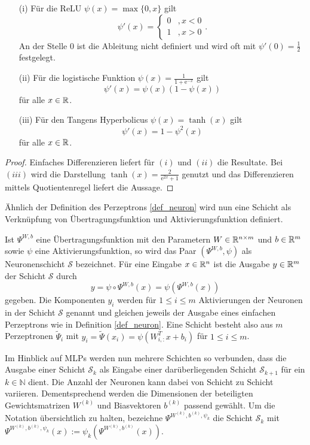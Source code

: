 \begin{lem}
    \begin{itemize}
        \item[(i)] Für die ReLU $\psi(x)=\max\{0,x\}$ gilt
         \[\psi'(x)=\begin{cases}
            0 &, x <0 \\
            1 &, x >0
        \end{cases}. 
        \]
        An der Stelle 0 ist die Ableitung nicht definiert und wird oft mit $\psi'(0)=\frac{1}{2}$ festgelegt.
        \item[(ii)] Für die logistische Funktion $\psi(x)=\frac{1}{1+\mathrm{e}^{-x}}$ gilt
        \[ 
            \psi'(x)=\psi(x)(1-\psi(x)) 
        \]
        für alle $x \in \mathbb{R}$.
        \item[(iii)] Für den Tangens Hyperbolicus $\psi(x)=\tanh(x)$ gilt
        \[ 
            \psi'(x)=1-\psi^2(x) 
        \]
        für alle $x \in \mathbb{R}$.
    \end{itemize}
\end{lem}
\begin{proof}
    Einfaches Differenzieren liefert für $(i)$ und $(ii)$ die Resultate. Bei $(iii)$ wird die Darstellung $\tanh(x)=\frac{2}{\mathrm{e}^{2x}+1}$ genutzt und das Differenzieren mittels Quotientenregel liefert die Aussage.
\end{proof}


Ähnlich der Definition des Perzeptrons \ref{def_neuron} wird nun eine Schicht als Verknüpfung von Übertragungsfunktion und Aktivierungsfunktion definiert.

\begin{defi}[Neuronenschicht]
    \label{def:NNlayer}
    Ist $\Psi^{W,b}$ eine Übertragungsfunktion mit den Parametern $W \in \mathbb{R}^{n \times m}$ und $b \in \mathbb{R}^m$ sowie $\psi$ eine Aktivierungsfunktion, so wird das Paar $(\Psi^{W,b}, \psi)$ als Neuronenschicht $\mathcal{S}$ bezeichnet. Für eine Eingabe $x \in \mathbb{R}^n$ ist die Ausgabe $y \in \mathbb{R}^m$ der Schicht $\mathcal{S}$ durch
    \[y=\psi \circ \Psi^{W,b}(x)= \psi\left(\Psi^{W,b}(x)\right)
        \] 
        gegeben. Die Komponenten $y_i$ werden für $1 \leq i \leq m$ Aktivierungen der Neuronen in der Schicht $\mathcal{S}$ genannt und gleichen jeweils der Ausgabe eines einfachen Perzeptrons wie in Definition \ref{def_neuron}. Eine Schicht besteht also aus $m$ Perzeptronen $\tilde{\Psi}_i$ mit $y_i=\tilde{\Psi}(x_i)=\psi(W_{i,:}^T x+b_i)$ für $1 \leq i \leq m$.
\end{defi}
Im Hinblick auf MLPs werden nun mehrere Schichten so verbunden, dass die Ausgabe einer Schicht $\mathcal{S}_k$ als Eingabe einer darüberliegenden Schicht $\mathcal{S}_{k+1}$ für ein $k \in \mathbb{N}$ dient. Die Anzahl der Neuronen kann dabei von Schicht zu Schicht variieren. Dementsprechend werden die Dimensionen der beteiligten Gewichtsmatrizen $W^{(k)}$ und Biasvektoren $b^{(k)}$ passend gewählt. 
Um die Notation übersichtlich zu halten, bezeichne $\Psi^{W^{(k)},b^{(k)},\psi_{k}}$ die Schicht $\mathcal{S}_k$ mit $\Psi^{W^{(k)},b^{(k)},\psi_{k}}(x):= \psi_{k} \left(\Psi^{W^{(k)},b^{(k)}}(x)\right)$.

